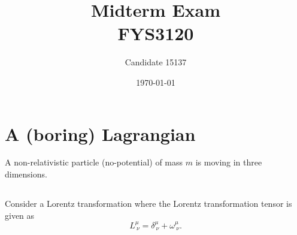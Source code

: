\documentclass[11pt]{amsart}
\title[FYS3120 Midterm]{Midterm Exam\\
		\hrulefill \large{ FYS3120 } \hrulefill}
\author[15137]{Candidate 15137}
\date{\today}
\begin{document}
\maketitle

\section{A (boring) Lagrangian}
A non-relativistic particle (no-potential) of mass $m$ is moving in three dimensions.

\subsection{}

\subsection{}

\subsection{}

\subsection{}

\subsection{}

\subsection{}

\subsection{}
Consider a Lorentz transformation where the Lorentz transformation tensor is given as
\begin{equation}
\label{eq:lorentztransform}
L^\mu_{\ \nu} = \delta^{\mu}_{\ \nu} + \omega^{\mu}_{\ \nu}.
\end{equation}
\end{document}
